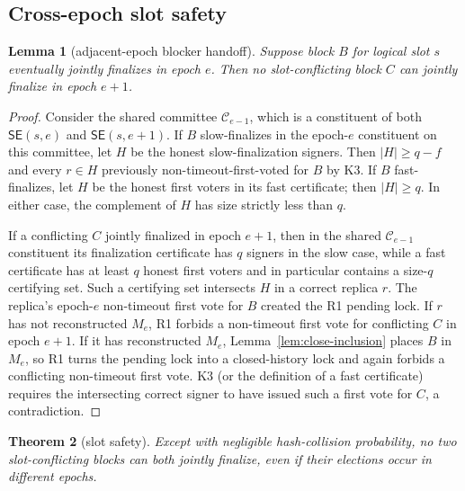 \documentclass[11pt]{article}
\newtheorem{theorem}{Theorem}
\newtheorem{lemma}[theorem]{Lemma}
\theoremstyle{definition}
\theoremstyle{remark}
\newcommand{\C}{\mathcal C}
\newcommand{\SE}{\mathsf{SE}}
\begin{document}
\subsection{Cross-epoch slot safety}

\begin{lemma}[adjacent-epoch blocker handoff]
\label{lem:adjacent-handoff}
Suppose block $B$ for logical slot $s$ eventually jointly finalizes in epoch $e$. Then no slot-conflicting block $C$ can jointly finalize in epoch $e+1$.
\end{lemma}

\begin{proof}
Consider the shared committee $\C_{e-1}$, which is a constituent of both $\SE(s,e)$ and $\SE(s,e+1)$. If $B$ slow-finalizes in the epoch-$e$ constituent on this committee, let $H$ be the honest slow-finalization signers. Then $|H|\ge q-f$ and every $r\in H$ previously non-timeout-first-voted for $B$ by K3. If $B$ fast-finalizes, let $H$ be the honest first voters in its fast certificate; then $|H|\ge q$. In either case, the complement of $H$ has size strictly less than $q$.

If a conflicting $C$ jointly finalized in epoch $e+1$, then in the shared $\C_{e-1}$ constituent its finalization certificate has $q$ signers in the slow case, while a fast certificate has at least $q$ honest first voters and in particular contains a size-$q$ certifying set. Such a certifying set intersects $H$ in a correct replica $r$. The replica's epoch-$e$ non-timeout first vote for $B$ created the R1 pending lock. If $r$ has not reconstructed $M_e$, R1 forbids a non-timeout first vote for conflicting $C$ in epoch $e+1$. If it has reconstructed $M_e$, Lemma~\ref{lem:close-inclusion} places $B$ in $M_e$, so R1 turns the pending lock into a closed-history lock and again forbids a conflicting non-timeout first vote. K3 (or the definition of a fast certificate) requires the intersecting correct signer to have issued such a first vote for $C$, a contradiction.
\end{proof}

\begin{theorem}[slot safety]
\label{thm:slot-safety}
Except with negligible hash-collision probability, no two slot-conflicting blocks can both jointly finalize, even if their elections occur in different epochs.
\end{theorem}
\end{document}
